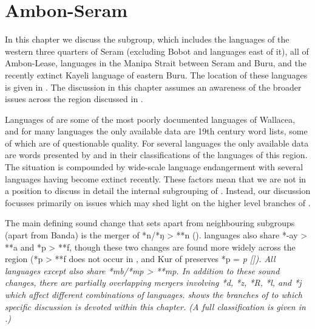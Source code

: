\chapter{Ambon-Seram}\label{ch:AS}
In this chapter we discuss the  subgroup,
which includes the languages of the western three quarters of
Seram (excluding Bobot and languages east of it),
all of Ambon-Lease, languages in the Manipa Strait between Seram
and Buru, and the recently extinct Kayeli language of eastern Buru.
The location of these languages is given in .
The discussion in this chapter assumes an awareness of the broader
issues across the region discussed in .

Languages of  are some of the most poorly documented
languages of Wallacea, and for many languages the only available data are 19th century
word lists, some of which are of questionable quality.
For several languages the only available data are words presented
by \citet{Stresemann1927} and \citet{Collins1983} in their classifications of the languages of this region.
The situation is compounded by wide-scale language endangerment
with several languages having become extinct recently.
These factors mean that we are not in a position to discuss in
detail the internal subgrouping of .
Instead, our discussion focusses primarily on issues which may
shed light on the higher level branches of .

The main defining sound change that sets  apart
from neighbouring subgroups (apart from Banda) is the merger
of *n/*ŋ > **n ().
 languages also share *-ay > **a
and *p > **f,
though these two changes are found more widely across the region
(*p > **f does not occur in ,
and Kur of  preserves *p = \it{p} []).
All  languages except  also share *mb/*mp > **mp.
In addition to these sound changes,
there are partially overlapping mergers involving *d,
*z, *R, *l, and *j which affect different
combinations of  languages.
 shows the branches of  to which specific
discussion is devoted within this chapter.
(A full classification is given in .)

\begin{figure}[h]\centering
	\begin{minipage}{70mm}
		\dirtree{%
			.1 {\tsc{Ambon-Seram}}.
					.2 {Boano [bzn]}.
					.2 {\tsc{Nuclear Ambon-Seram}}.
							.3 {\tsc{Ambon-West Seram}}.
									.4 {\tsc{Northwest Seram}}.
									.4 {\tsc{Nuclear Ambon-West Seram}}.
											.5 {Kayeli [kzl]}.
											.5 {\tsc{Piru Bay}}.
													.6 {\tsc{East Piru Bay}}.
															.7 {\tsc{East Littoral}}.
															.7 {\tsc{Solehua}}.
							.3 {\tsc{Atamanu}}.
							.3 {\tsc{Patakai-Manusela}}.
					.2 {\tsc{Seti-Benggoi}}.
					.2 {Hoti [hti]}.
		}
	\end{minipage}
\end{figure}

